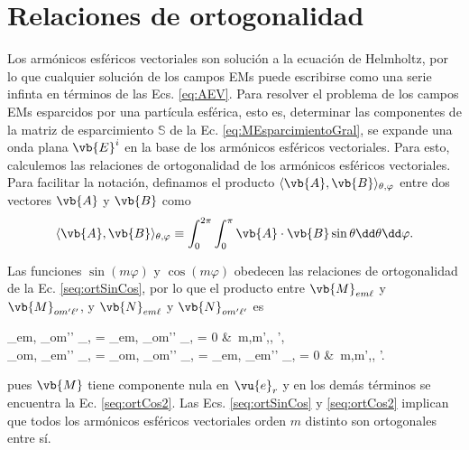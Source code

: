 \section{Relaciones de ortogonalidad}

Los armónicos esféricos vectoriales son solución a la ecuación de Helmholtz, por lo que cualquier solución de los campos EMs puede escribirse como una serie infinta en términos de las Ecs. \eqref{eq:AEV}. Para resolver el problema de los campos EMs esparcidos por una partícula esférica, esto es, determinar las componentes de la matriz de esparcimiento $\mathbb{S}$ de la Ec. \eqref{eq:MEsparcimientoGral}, se expande una onda plana $\vb{E}^i$ en la base de los armónicos esféricos vectoriales. Para esto, calculemos las relaciones de ortogonalidad de los armónicos esféricos vectoriales. Para facilitar la notación, definamos el producto  $\langle \vb{A},\vb{B} \rangle_{\theta,\varphi}$ entre dos vectores $\vb{A}$ y $\vb{B}$ como 
%
	 \begin{align*}
\langle \vb{A},\vb{B} \rangle_{\theta,\varphi} \equiv \int_0^{2\pi}\int_0^\pi \vb{A}\cdot\vb{B} \sin\theta \dd\theta \dd\varphi	 .
	 \end{align*}
%

 Las funciones $\sin(m\varphi)$ y $\cos(m\varphi)$ obedecen las relaciones de ortogonalidad de la Ec. \eqref{seq:ortSinCos}, por lo que el producto entre $\vb{M}_{em\ell}$ y $\vb{M}_{om'\ell'}$, y $\vb{N}_{em\ell}$ y $\vb{N}_{om'\ell'}$ es
	\begin{tcolorbox}
		\langle{}_{em\ell}, _{om'\ell'} \rangle_{\theta,\varphi} =
		\langle{}_{em\ell}, _{om'\ell'} \rangle_{\theta,\varphi} = 0
		&\qquad \forall\,  m,m',\ell, \ell',\\
		\intertext{así como también}
		\langle{}_{om\ell}, _{em'\ell'} \rangle_{\theta,\varphi} = 
		\langle{}_{om\ell}, _{om'\ell'} \rangle_{\theta,\varphi} = 	
		\langle{}_{em\ell}, _{em'\ell'} \rangle_{\theta,\varphi} = 	0
		&\qquad \forall\,  m,m',\ell, \ell'.				
	\end{tcolorbox}\noindent
pues $\vb{M}$ tiene componente nula en $\vu{e}_r$ y en los demás términos se encuentra la Ec. \eqref{seq:ortCos2}. Las Ecs. \eqref{seq:ortSinCos} y \eqref{seq:ortCos2} implican que todos los armónicos esféricos vectoriales orden $m$ distinto  son ortogonales entre sí.

